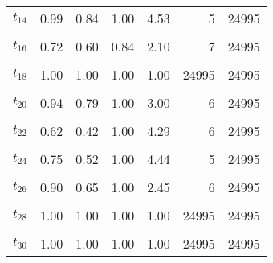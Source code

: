 \begin{table}
\begin{tabular}[t]{lrrrrrr}
$t_{14}$ & 0.99 & 0.84 & 1.00 & 4.53 & 5 & 24995\\
\cellcolor{gray!6}{$t_{15}$} & \cellcolor{gray!6}{1.00} & \cellcolor{gray!6}{1.00} & \cellcolor{gray!6}{1.00} & \cellcolor{gray!6}{1.00} & \cellcolor{gray!6}{24995} & \cellcolor{gray!6}{24995}\\
$t_{16}$ & 0.72 & 0.60 & 0.84 & 2.10 & 7 & 24995\\
\cellcolor{gray!6}{$t_{17}$} & \cellcolor{gray!6}{0.69} & \cellcolor{gray!6}{0.59} & \cellcolor{gray!6}{0.74} & \cellcolor{gray!6}{2.29} & \cellcolor{gray!6}{6} & \cellcolor{gray!6}{5}\\
$t_{18}$ & 1.00 & 1.00 & 1.00 & 1.00 & 24995 & 24995\\
\cellcolor{gray!6}{$t_{19}$} & \cellcolor{gray!6}{1.00} & \cellcolor{gray!6}{0.98} & \cellcolor{gray!6}{1.00} & \cellcolor{gray!6}{2.28} & \cellcolor{gray!6}{6} & \cellcolor{gray!6}{24995}\\
$t_{20}$ & 0.94 & 0.79 & 1.00 & 3.00 & 6 & 24995\\
\cellcolor{gray!6}{$t_{21}$} & \cellcolor{gray!6}{0.82} & \cellcolor{gray!6}{0.57} & \cellcolor{gray!6}{1.00} & \cellcolor{gray!6}{4.06} & \cellcolor{gray!6}{6} & \cellcolor{gray!6}{24995}\\
$t_{22}$ & 0.62 & 0.42 & 1.00 & 4.29 & 6 & 24995\\
\cellcolor{gray!6}{$t_{23}$} & \cellcolor{gray!6}{0.86} & \cellcolor{gray!6}{0.73} & \cellcolor{gray!6}{1.00} & \cellcolor{gray!6}{3.37} & \cellcolor{gray!6}{6} & \cellcolor{gray!6}{24995}\\
$t_{24}$ & 0.75 & 0.52 & 1.00 & 4.44 & 5 & 24995\\
\cellcolor{gray!6}{$t_{25}$} & \cellcolor{gray!6}{0.81} & \cellcolor{gray!6}{0.62} & \cellcolor{gray!6}{1.00} & \cellcolor{gray!6}{2.08} & \cellcolor{gray!6}{7} & \cellcolor{gray!6}{24995}\\
$t_{26}$ & 0.90 & 0.65 & 1.00 & 2.45 & 6 & 24995\\
\cellcolor{gray!6}{$t_{27}$} & \cellcolor{gray!6}{0.74} & \cellcolor{gray!6}{0.46} & \cellcolor{gray!6}{1.00} & \cellcolor{gray!6}{2.73} & \cellcolor{gray!6}{9} & \cellcolor{gray!6}{24995}\\
$t_{28}$ & 1.00 & 1.00 & 1.00 & 1.00 & 24995 & 24995\\
\cellcolor{gray!6}{$t_{29}$} & \cellcolor{gray!6}{1.00} & \cellcolor{gray!6}{1.00} & \cellcolor{gray!6}{1.00} & \cellcolor{gray!6}{1.11} & \cellcolor{gray!6}{33} & \cellcolor{gray!6}{24995}\\
$t_{30}$ & 1.00 & 1.00 & 1.00 & 1.00 & 24995 & 24995\\

\end{tabular}
\end{table}
